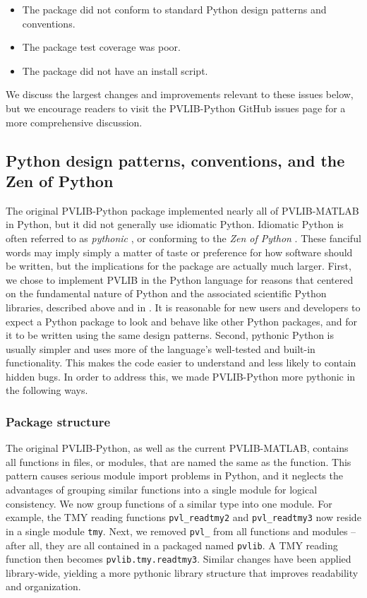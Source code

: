 \documentclass[conference]{IEEEtran}
\newcommand{\holmgren}[1]{{\bf\color{red} WH: #1}}
\begin{document}
\begin{itemize}
\item The package did not conform to standard Python design patterns and conventions.
\item The package test coverage was poor. 
\item The package did not have an install script.
\end{itemize}

We discuss the largest changes and improvements relevant to these issues below, but we encourage readers to visit the PVLIB-Python GitHub issues page for a more comprehensive discussion.


\subsection{Python design patterns, conventions, and the Zen of Python}

The original PVLIB-Python package implemented nearly all of PVLIB-MATLAB in Python, but it did not generally use idiomatic Python.
Idiomatic Python is often referred to as \emph{pythonic} \cite{pythonic}, or conforming to the \emph{Zen of Python} \cite{zenofpython}. 
These fanciful words may imply simply a matter of taste or preference for how software should be written, but the implications for the package are actually much larger.
First, we chose to implement PVLIB in the Python language for reasons that centered on the fundamental nature of Python and the associated scientific Python libraries, described above and in \cite{andrews}. 
It is reasonable for new users and developers to expect a Python package to look and behave like other Python packages, and for it to be written using the same design patterns.
Second, pythonic Python is usually simpler and uses more of the language's well-tested and built-in functionality.
This makes the code easier to understand and less likely to contain hidden bugs.
In order to address this, we made PVLIB-Python more pythonic in the following ways.

\subsubsection{Package structure} 
The original PVLIB-Python, as well as the current PVLIB-MATLAB, contains all functions in files, or modules, that are named the same as the function. 
This pattern causes serious module import problems in Python, and it neglects the advantages of grouping similar functions into a single module for logical consistency.
We now group functions of a similar type into one module. 
For example, the TMY reading functions \texttt{pvl{\_}readtmy2} and \texttt{pvl{\_}readtmy3} now reside in a single module \texttt{tmy}. 
Next, we removed \texttt{pvl{\_}} from all functions and modules -- after all, they are all contained in a packaged named \texttt{pvlib}. 
A TMY reading function then becomes \texttt{pvlib.tmy.readtmy3}. 
Similar changes have been applied library-wide, yielding a more pythonic library structure that improves readability and organization. 
\end{document}
